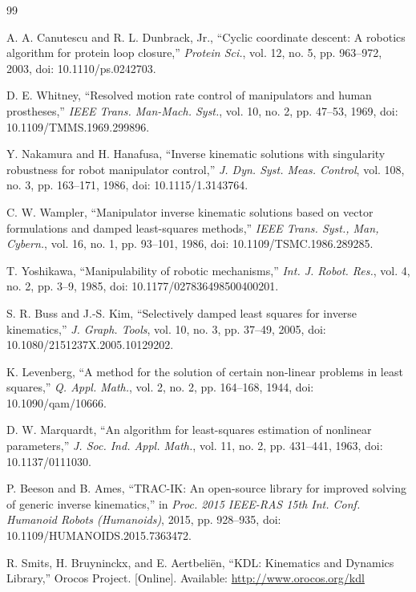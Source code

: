 \documentclass[10pt,conference]{IEEEtran}
\begin{document}
\begin{thebibliography}{99}
\sloppy

A. A. Canutescu and R. L. Dunbrack, Jr., ``Cyclic coordinate descent: A robotics
algorithm for protein loop closure,'' \emph{Protein Sci.}, vol. 12, no. 5,
pp. 963--972, 2003, doi: 10.1110/ps.0242703.

D. E. Whitney, ``Resolved motion rate control of manipulators and human
prostheses,'' \emph{IEEE Trans. Man-Mach. Syst.}, vol. 10, no. 2, pp. 47--53,
1969, doi: 10.1109/TMMS.1969.299896.

Y. Nakamura and H. Hanafusa, ``Inverse kinematic solutions with singularity
robustness for robot manipulator control,'' \emph{J. Dyn. Syst. Meas. Control},
vol. 108, no. 3, pp. 163--171, 1986, doi: 10.1115/1.3143764.

C. W. Wampler, ``Manipulator inverse kinematic solutions based on vector
formulations and damped least-squares methods,'' \emph{IEEE Trans. Syst., Man,
Cybern.}, vol. 16, no. 1, pp. 93--101, 1986, doi: 10.1109/TSMC.1986.289285.

T. Yoshikawa, ``Manipulability of robotic mechanisms,'' \emph{Int. J. Robot.
Res.}, vol. 4, no. 2, pp. 3--9, 1985, doi: 10.1177/027836498500400201.

S. R. Buss and J.-S. Kim, ``Selectively damped least squares for inverse
kinematics,'' \emph{J. Graph. Tools}, vol. 10, no. 3, pp. 37--49, 2005,
doi: 10.1080/2151237X.2005.10129202.

K. Levenberg, ``A method for the solution of certain non-linear problems in least
squares,'' \emph{Q. Appl. Math.}, vol. 2, no. 2, pp. 164--168, 1944,
doi: 10.1090/qam/10666.

D. W. Marquardt, ``An algorithm for least-squares estimation of nonlinear
parameters,'' \emph{J. Soc. Ind. Appl. Math.}, vol. 11, no. 2, pp. 431--441,
1963, doi: 10.1137/0111030.

P. Beeson and B. Ames, ``TRAC-IK: An open-source library for improved solving of
generic inverse kinematics,'' in \emph{Proc. 2015 IEEE-RAS 15th Int. Conf.
Humanoid Robots (Humanoids)}, 2015, pp. 928--935,
doi: 10.1109/HUMANOIDS.2015.7363472.

R. Smits, H. Bruyninckx, and E. Aertbeli\"{e}n, ``KDL: Kinematics and Dynamics
Library,'' Orocos Project. [Online]. Available: \url{http://www.orocos.org/kdl}


\end{thebibliography}
\end{document}

